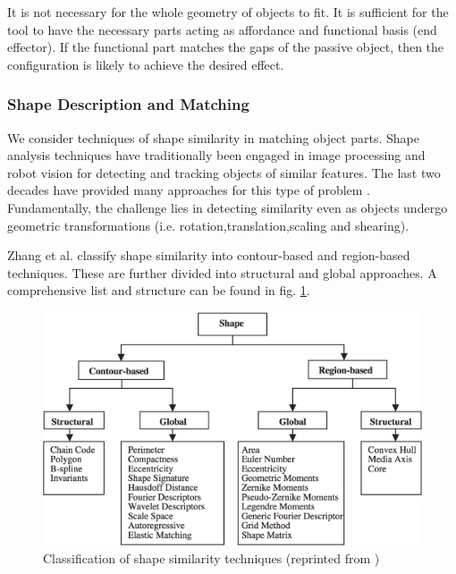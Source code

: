 \documentclass[
    a4paper,
    man,
    floatsintext,
    british
]{apa6}
\begin{document}
It is not necessary for the whole geometry of objects to fit. It is sufficient for the tool to have the necessary parts acting as affordance and functional basis (end effector\cite{zhu2015}). If the functional part matches the gaps of the passive object, then the configuration is likely to achieve the desired effect. 

\subsubsection{Shape Description and Matching}

We consider techniques of shape similarity in matching object parts. Shape analysis techniques have traditionally been engaged in image processing and robot vision for detecting and tracking objects of similar features. The last two decades have provided many approaches for this type of problem \cite{loncaric1998,zhang2004,veltkamp2001,robert2012}. Fundamentally, the challenge lies in detecting similarity even as objects undergo geometric transformations (i.e. rotation,translation,scaling and shearing).     

Zhang\cite{zhang2004} et al. classify shape similarity into contour-based and region-based techniques. These are further divided into structural and global approaches. A comprehensive list and structure can be found in fig. \ref{fig:shape_similarity}.

\begin{figure}[b]
  \centering
  \includegraphics[width=1\textwidth]{./figures/similarity_techniques.png}
  \caption{Classification of shape similarity techniques (reprinted from \cite{zhang2004})}
  \label{fig:shape_similarity}
\end{figure}  
\end{document}
